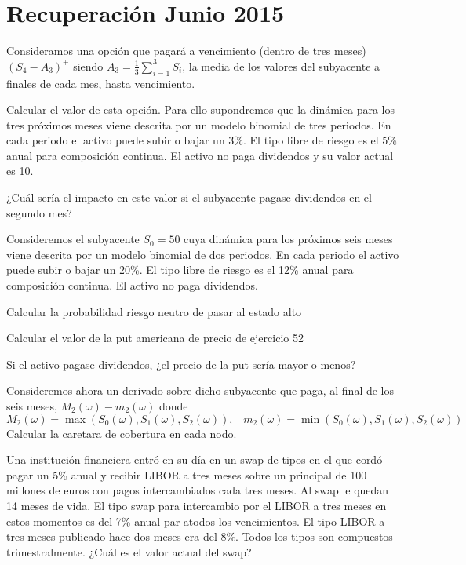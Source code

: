 \section{Recuperación Junio 2015}

\begin{problem}[1]
Consideramos una opción que pagará a vencimiento (dentro de tres meses) $(S_4-A_3)^+$ siendo $A_3=\frac{1}{3}\sum_{i=1}^3S_i$, la media de los valores del subyacente a finales de cada mes, hasta vencimiento.

\ppart Calcular el valor de esta opción. Para ello supondremos que la dinámica para los tres próximos meses viene descrita por un modelo binomial de tres periodos. En cada periodo el activo puede subir o bajar un 3\%. El tipo libre de riesgo es el 5\% anual para composición continua. El activo no paga dividendos y su valor actual es 10.

\ppart ¿Cuál sería el impacto en este valor si el subyacente pagase dividendos en el segundo mes?

\solution




\end{problem}

\begin{problem}[2]
Consideremos el subyacente $S_0=50$ cuya dinámica para los próximos seis meses viene descrita por un modelo binomial de dos periodos. En cada periodo el activo puede subir o bajar un 20\%. El tipo libre de riesgo es el 12\% anual para composición continua. El activo no paga dividendos.

\ppart Calcular la probabilidad riesgo neutro de pasar al estado alto

\ppart Calcular el valor de la put americana de precio de ejercicio 52

\ppart Si el activo pagase dividendos, ¿el precio de la put sería mayor o menos?

\ppart Consideremos ahora un derivado sobre dicho subyacente que paga, al final de los seis meses, $M_2(ω)-m_2(ω)$ donde
\[M_2(ω)=\max(S_0(ω),S_1(ω),S_2(ω)), \;\;\; m_2(ω)=\min(S_0(ω),S_1(ω),S_2(ω))\]
Calcular la caretara de cobertura en cada nodo.

\solution

\end{problem}

\begin{problem}[3]
Una institución financiera entró en su día en un swap de tipos en el que cordó pagar un 5\% anual y recibir LIBOR a tres meses sobre un principal de 100 millones de euros con pagos intercambiados cada tres meses. Al swap le quedan 14 meses de vida. El tipo swap para intercambio por el LIBOR a tres meses en estos momentos es del 7\% anual par atodos los vencimientos. El tipo LIBOR a tres meses publicado hace dos meses era del 8\%. Todos los tipos son compuestos trimestralmente. ¿Cuál es el valor actual del swap?

\solution

\end{problem}

